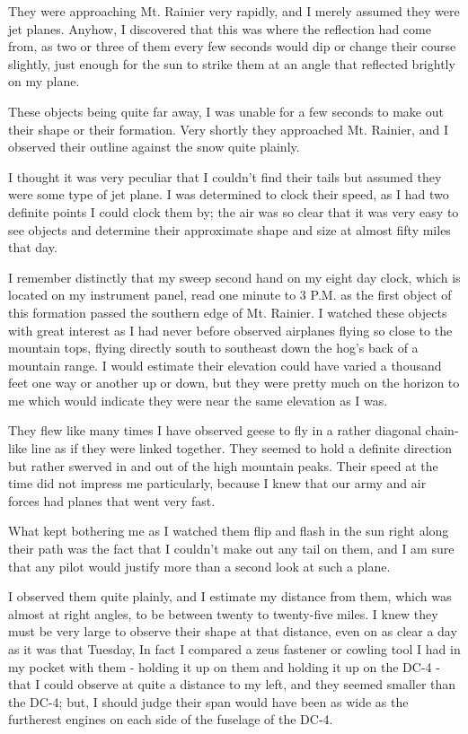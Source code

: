 \begin{svgraybox}
      They were approaching Mt. Rainier very rapidly, and I merely assumed they were jet planes. Anyhow, I discovered that this was where the reflection had come from, as two or three of them every few seconds would dip or change their course slightly, just enough for the sun to strike them at an angle that reflected brightly on my plane.

      These objects being quite far away, I was unable for a few seconds to make out their shape or their formation. Very shortly they approached Mt. Rainier, and I observed their outline against the snow quite plainly.

      I thought it was very peculiar that I couldn't find their tails but assumed they were some type of jet plane. I was determined to clock their speed, as I had two definite points I could clock them by; the air was so clear that it was very easy to see objects and determine their approximate shape and size at almost fifty miles that day.

      I remember distinctly that my sweep second hand on my eight day clock, which is located on my instrument panel,
read one minute to 3 P.M. as the first object of this formation passed the southern edge of Mt. Rainier.
I watched these objects with great interest as I had never before observed
airplanes flying so close to the mountain tops, flying directly south to southeast down the hog's back of a mountain range. I would estimate their elevation could have varied a thousand feet one way or another up or down, but they were pretty much on the horizon to me which would indicate they were near the same elevation as I was.

      They flew like many times I have observed geese to fly in a rather diagonal chain-like line as if they were linked together. They seemed to hold a definite direction but rather swerved in and out of the high mountain peaks. Their speed at the time did not impress me particularly, because I knew that our army and air forces had planes that went very fast.

      What kept bothering me as I watched them flip and flash in the sun right along their path was the fact that I couldn't make out any tail on them, and I am sure that any pilot would justify more than a second look at such a plane.

      I observed them quite plainly, and I estimate my distance from them, which was almost at right angles, to be between twenty to twenty-five miles. I knew they must be very large to observe their shape at that distance, even on as clear a day as it was that Tuesday, In fact I compared a zeus fastener or cowling tool I had in my pocket with them - holding it up on them and holding it up on the DC-4 - that I could observe at quite a distance to my left, and they seemed smaller than the DC-4; but, I should judge their span would have been as wide as the furtherest engines on each side of the fuselage of the DC-4.


\end{svgraybox}
